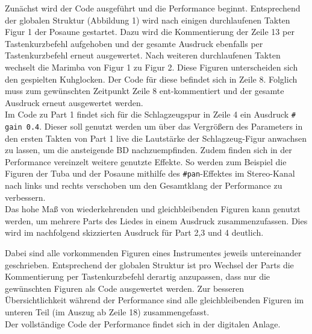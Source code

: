 \documentclass[
10pt, %
a4paper, %
oneside, %
headinclude,footinclude, %
BCOR5mm, %
]{scrartcl}
\begin{document}
\noindent Zunächst wird der Code ausgeführt und die Performance beginnt.
Entsprechend der globalen Struktur (Abbildung 1) wird nach einigen durchlaufenen Takten Figur 1 der Posaune gestartet. Dazu wird die Kommentierung der Zeile 13 per Tastenkurzbefehl aufgehoben und der gesamte Ausdruck ebenfalls per Tastenkurzbefehl erneut ausgewertet. Nach weiteren durchlaufenen Takten wechselt die Marimba von Figur 1 zu Figur 2. Diese Figuren unterscheiden sich den gespielten Kuhglocken. Der Code für diese befindet sich in Zeile 8. Folglich muss zum gewünschten Zeitpunkt Zeile 8 ent-kommentiert und der gesamte Ausdruck erneut ausgewertet werden.\\
Im Code zu Part 1 findet sich für die Schlagzeugspur in Zeile 4 ein Ausdruck \verb|# gain 0.4|. Dieser soll genutzt werden um über das Vergrößern des Parameters in den ersten Takten von Part 1 live die Lautstärke der Schlagzeug-Figur anwachsen zu lassen, um die ansteigende BD nachzuempfinden. Zudem finden sich in der Performance vereinzelt weitere genutzte Effekte. So werden zum Beispiel die Figuren der Tuba und der Posaune mithilfe des \verb|#pan|-Effektes\cite{tid15} im Stereo-Kanal nach links und rechts verschoben um den Gesamtklang der Performance zu verbessern.\\

\noindent Das hohe Maß von wiederkehrenden und gleichbleibenden Figuren kann genutzt werden, um mehrere Parts des Liedes in einem Ausdruck zusammenzufassen. Dies wird im nachfolgend skizzierten Ausdruck für Part 2,3 und 4 deutlich. 


\lstset{
	numbers=none,
}

\noindent Dabei sind alle vorkommenden Figuren eines Instrumentes jeweils untereinander geschrieben. Entsprechend der globalen Struktur ist pro Wechsel der Parts die Kommentierung per Tastenkurzbefehl derartig anzupassen, dass nur die gewünschten Figuren als Code ausgewertet werden. Zur besseren Übersichtlichkeit während der Performance sind alle gleichbleibenden Figuren im unteren Teil (im Auszug ab Zeile 18) zusammengefasst.\\

\noindent Der vollständige Code der Performance findet sich in der digitalen Anlage.
\end{document}
